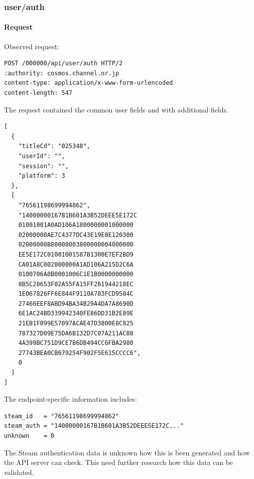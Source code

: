 \subsubsection{user/auth}
\label{subsec:api_user_auth}

\paragraph{Request}

Observed request:

\begin{lstlisting}
POST /000000/api/user/auth HTTP/2
:authority: cosmos.channel.or.jp
content-type: application/x-www-form-urlencoded
content-length: 547
\end{lstlisting}

The request contained the common user fields and with additional fields.

\begin{lstlisting}
[
  {
    "titleCd": "025348",
    "userId": "",
    "session": "",
    "platform": 3
  },
  [
    "76561198699994862",
    "14000000167B1B601A3B52DEEE5E172C
	01001001A0AD106A1800000001000000
	02000000AE7C4377DC43E19E8E120300
	02000000B80000003800000004000000
	EE5E172C01001001587B1300E7EF2BD9
	CA01A8C002000000A1AD106A215D2C6A
	0100706A0B0001006C1E1B0000000000
	8B5C28653F02A55FA15FF261944218EC
	1E067826FF6E844F9110A783FCD9584C
	27466EEF8ABD94BA34B29A4DA7A8690D
	6E1AC24BD339942340FE86DD31B2E89E
	21EB1F099E57097ACAE47D3800E8C825
	787327D09E75DA6B132D7C07A211AC88
	4A399BC751D9CE7B6DB494CC6FBA2980
	27743BEA0CB679254F902F5E615CCCC6",
    0
  ]
]
\end{lstlisting}

The endpoint-specific information includes:

\begin{lstlisting}
steam_id   = "76561198699994862"
steam_auth = "14000000167B1B601A3B52DEEE5E172C..."
unknown    = 0
\end{lstlisting}

\begin{tcolorbox}[colback=yellow!10,colframe=orange!80!black,title=Warning]
The Steam authentication data is unknown how this is been generated and how the API server can check.
This need further research how this data can be validated.
\end{tcolorbox}

